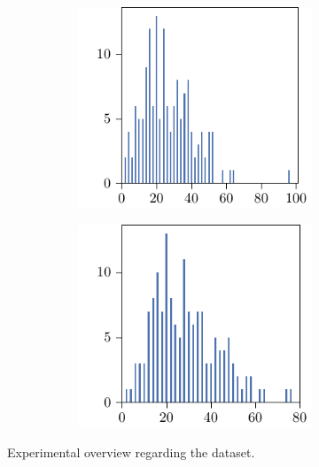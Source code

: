 \begin{figure}[p]
\begin{subfigure}{\textwidth}
\begin{subfigure}{\mymultiouter}
          \includegraphics[width=\mymultiinner]{figures/new/manhattan-rain_sydney-qlibra-retraining}
    \end{subfigure}
    \begin{subfigure}{\mymultiouter}
        \centering
          \includegraphics[width=\mymultiinner]{figures/new/manhattan-rain_sydney-permutation-retraining}
      \end{subfigure}
  \end{subfigure}
    \caption{Experimental overview regarding the \rain{} dataset.}
\end{figure}



